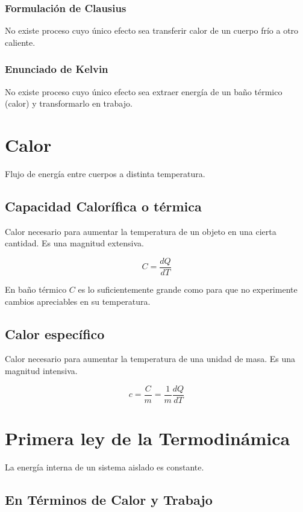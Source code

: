 \subsubsection{Formulación de Clausius} No existe proceso cuyo único efecto sea transferir calor de un cuerpo frío a otro caliente.

\subsubsection{Enunciado de Kelvin} No existe proceso cuyo único efecto sea extraer energía de un baño térmico (calor) y transformarlo en trabajo.

\section{Calor}

Flujo de energía entre cuerpos a distinta temperatura.

\subsection{Capacidad Calorífica o térmica}

Calor necesario para aumentar la temperatura de un objeto en una cierta cantidad. Es una magnitud extensiva.

\[C = \frac{dQ}{dT}\]

En baño térmico $C$ es lo suficientemente grande como para que no experimente cambios apreciables en su temperatura.

\subsection{Calor específico}

Calor necesario para aumentar la temperatura de una unidad de masa. Es una magnitud intensiva.

\[c = \frac{C}{m} = \frac{1}{m}\frac{dQ}{dT}\]

\section{Primera ley de la Termodinámica}
\label{1ley}
La energía interna de un sistema aislado es constante.

\subsection{En Términos de Calor y Trabajo}

